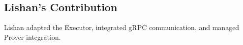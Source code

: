 \subsection{Lishan's Contribution}
\label{sec:lishan_contribution}
Lishan adapted the Executor, integrated gRPC communication, and managed Prover integration.